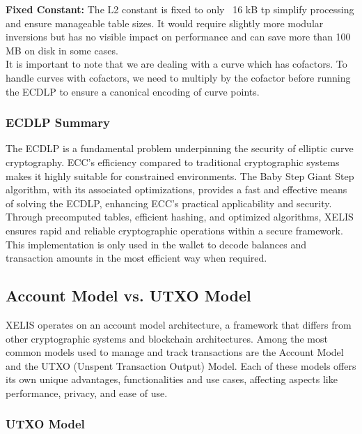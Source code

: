 \documentclass[10pt,a4paper,twocolumn]{article}
\begin{document}
\textbf{Fixed Constant:} The L2 constant is fixed to only ~16 kB tp simplify processing and ensure manageable table sizes. It would require slightly more modular inversions but has no visible impact on performance and can save more than 100 MB on disk in some cases.\\

It is important to note that we are dealing with a curve which has cofactors. To handle curves with cofactors, we need to multiply by the cofactor before running the ECDLP to ensure a canonical encoding of curve points.\\

\subsubsection{ECDLP Summary}

The ECDLP is a fundamental problem underpinning the security of elliptic curve cryptography. ECC’s efficiency compared to traditional cryptographic systems makes it highly suitable for constrained environments. The Baby Step Giant Step algorithm, with its associated optimizations, provides a fast and effective means of solving the ECDLP, enhancing ECC's practical applicability and security. Through precomputed tables, efficient hashing, and optimized algorithms, XELIS ensures rapid and reliable cryptographic operations within a secure framework.\\

This implementation is only used in the wallet to decode balances and transaction amounts in the most efficient way when required.

\subsection{Account Model vs. UTXO Model}

XELIS operates on an account model architecture, a framework that differs from other cryptographic systems and blockchain architectures. Among the most common models used to manage and track transactions are the Account Model and the UTXO (Unspent Transaction Output) Model. Each of these models offers its own unique advantages, functionalities and use cases, affecting aspects like performance, privacy, and ease of use.\\

\subsubsection{UTXO Model}
\end{document}
